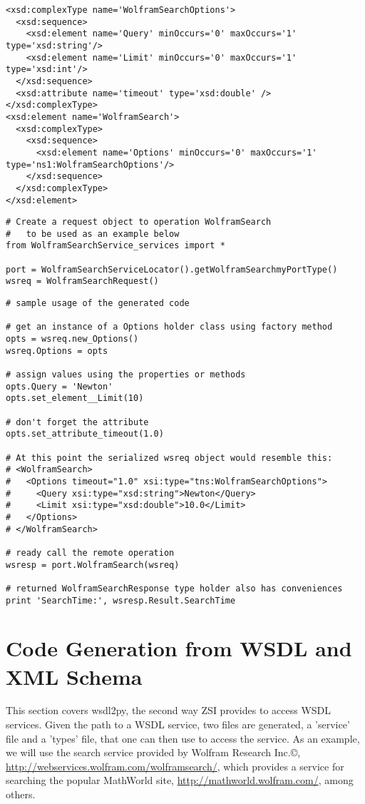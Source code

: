 \begin{verbatim}
<xsd:complexType name='WolframSearchOptions'>
  <xsd:sequence>
    <xsd:element name='Query' minOccurs='0' maxOccurs='1' type='xsd:string'/>
    <xsd:element name='Limit' minOccurs='0' maxOccurs='1' type='xsd:int'/>
  </xsd:sequence>
  <xsd:attribute name='timeout' type='xsd:double' />
</xsd:complexType>
<xsd:element name='WolframSearch'>
  <xsd:complexType>
    <xsd:sequence>
      <xsd:element name='Options' minOccurs='0' maxOccurs='1' type='ns1:WolframSearchOptions'/>
    </xsd:sequence>
  </xsd:complexType>
</xsd:element>
\end{verbatim}

\begin{verbatim}
# Create a request object to operation WolframSearch
#   to be used as an example below
from WolframSearchService_services import *

port = WolframSearchServiceLocator().getWolframSearchmyPortType()
wsreq = WolframSearchRequest()
\end{verbatim}



\begin{verbatim}
# sample usage of the generated code

# get an instance of a Options holder class using factory method
opts = wsreq.new_Options()
wsreq.Options = opts

# assign values using the properties or methods
opts.Query = 'Newton'
opts.set_element__Limit(10)

# don't forget the attribute
opts.set_attribute_timeout(1.0)

# At this point the serialized wsreq object would resemble this:
# <WolframSearch>
#   <Options timeout="1.0" xsi:type="tns:WolframSearchOptions">
#     <Query xsi:type="xsd:string">Newton</Query>
#     <Limit xsi:type="xsd:double">10.0</Limit>
#   </Options>
# </WolframSearch>

# ready call the remote operation
wsresp = port.WolframSearch(wsreq)

# returned WolframSearchResponse type holder also has conveniences
print 'SearchTime:', wsresp.Result.SearchTime
\end{verbatim}

\section{Code Generation from WSDL and XML Schema}

This section covers wsdl2py, the second way ZSI provides to access WSDL
services.  Given the path to a WSDL service, two files are generated, a 
'service' file and a 'types' file, that one can then use to access the
service.  As an example, we will use the search service provided by Wolfram
Research Inc.\copyright{}, \url{http://webservices.wolfram.com/wolframsearch/}, 
which provides a service for searching the popular MathWorld site, 
\url{http://mathworld.wolfram.com/}, among others.

